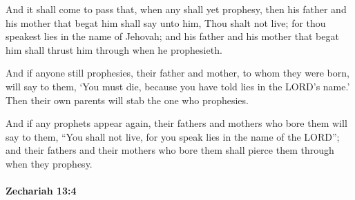 			\begin{versebox}
					\item[BHS] 
					\item[LXX] 
					\item[ASV] And it shall come to pass that, when any shall yet prophesy, then his father and his mother that begat him shall say unto him, Thou shalt not live; for thou speakest lies in the name of Jehovah; and his father and his mother that begat him shall thrust him through when he prophesieth.
					\item[NIV] And if anyone still prophesies, their father and mother, to whom they were born, will say to them, ‘You must die, because you have told lies in the LORD’s name.’ Then their own parents will stab the one who prophesies.
					\item[NRSV] And if any prophets appear again, their fathers and mothers who bore them will say to them, “You shall not live, for you speak lies in the name of the LORD”; and their fathers and their mothers who bore them shall pierce them through when they prophesy.
			\end{versebox}

		\paragraph{Zechariah 13:4} %
			\label{ZECHARIAH-13-4}

